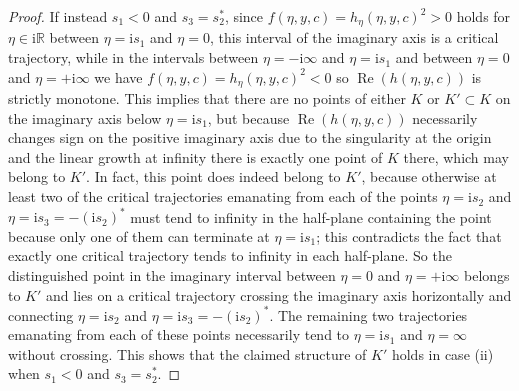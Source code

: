 \documentclass[11pt]{article}
\numberwithin{equation}{section}
\numberwithin{equation}{section}
\begin{document}
\begin{proof}
If instead $s_1<0$ and $s_3=s_2^*$, since $f(\eta,y,c)=h_\eta(\eta,y,c)^2>0$ holds for $\eta\in \mathrm{i} \mathbb{R}$ between $\eta=\mathrm{i} s_1$ and $\eta=0$, this interval of the imaginary axis is a critical trajectory, while in the intervals between $\eta=-\mathrm{i}\infty$ and $\eta=\mathrm{i} s_1$ and between $\eta=0$ and $\eta=+\mathrm{i}\infty$ we have $f(\eta,y,c)=h_\eta(\eta,y,c)^2<0$ so $\operatorname{Re}(h(\eta,y,c))$ is strictly monotone. This implies that there are no points of either $K$ or $K'\subset K$ on the imaginary axis below $\eta=\mathrm{i} s_1$, but because $\operatorname{Re}(h(\eta,y,c))$ necessarily changes sign on the positive imaginary axis due to the singularity at the origin and the linear growth at infinity there is exactly one point of $K$ there, which may belong to $K'$. In fact, this point does indeed belong to $K'$, because otherwise at least two of the critical trajectories emanating from each of the points $\eta=\mathrm{i} s_2$ and $\eta=\mathrm{i} s_3=-(\mathrm{i} s_2)^*$ must tend to infinity in the half-plane containing the point because only one of them can terminate at $\eta=\mathrm{i} s_1$; this contradicts the fact that exactly one critical trajectory tends to infinity in each half-plane. So the distinguished point in the imaginary interval between $\eta=0$ and $\eta=+\mathrm{i}\infty$ belongs to $K'$ and lies on a critical trajectory crossing the imaginary axis horizontally and connecting $\eta=\mathrm{i} s_2$ and $\eta=\mathrm{i} s_3=-(\mathrm{i} s_2)^*$. The remaining two trajectories emanating from each of these points necessarily tend to $\eta=\mathrm{i} s_1$ and $\eta=\infty$ without crossing. This shows that the claimed structure of $K'$ holds in case (ii) when $s_1<0$ and $s_3=s_2^*$.


\end{proof}
\end{document}
